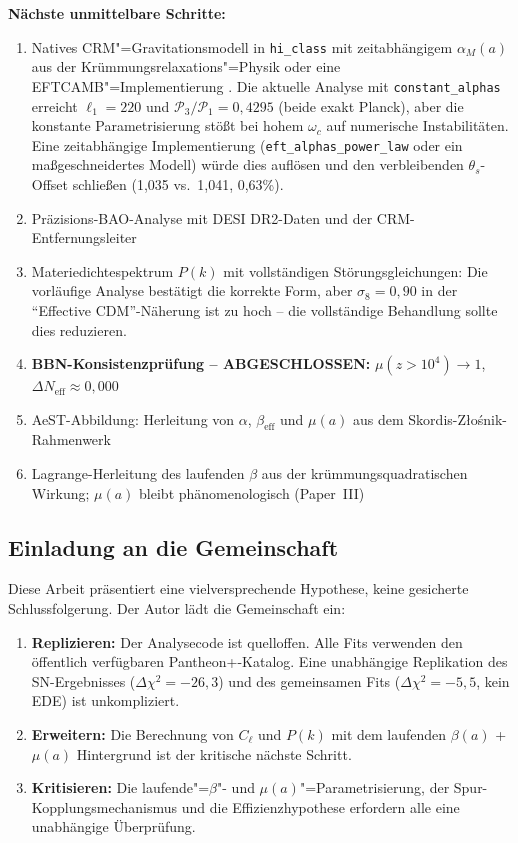 \documentclass[aps,prd,twocolumn,superscriptaddress,nofootinbib,floatfix]{revtex4-2}
\begin{document}
\textbf{Nächste unmittelbare Schritte:}
\begin{enumerate}
\item Natives CRM"=Gravitationsmodell in \texttt{hi\_class} mit zeitabhängigem $\alpha_M(a)$ aus der Krümmungsrelaxations"=Physik oder eine EFTCAMB"=Implementierung \cite{Hu2014}. Die aktuelle Analyse mit \texttt{constant\_alphas} erreicht $\ell_1 = 220$ und $\mathcal{P}_3/\mathcal{P}_1 = 0{,}4295$ (beide exakt Planck), aber die konstante Parametrisierung stößt bei hohem $\omega_c$ auf numerische Instabilitäten. Eine zeitabhängige Implementierung (\texttt{eft\_alphas\_power\_law} oder ein maßgeschneidertes Modell) würde dies auflösen und den verbleibenden $\theta_s$-Offset schließen (1,035 vs.\ 1,041, 0,63\%).
\item Präzisions-BAO-Analyse mit DESI DR2-Daten und der CRM-Entfernungsleiter
\item Materiedichtespektrum $P(k)$ mit vollständigen Störungsgleichungen: Die vorläufige Analyse bestätigt die korrekte Form, aber $\sigma_8 = 0{,}90$ in der "`Effective CDM"'-Näherung ist zu hoch -- die vollständige Behandlung sollte dies reduzieren.
\item \textbf{BBN-Konsistenzprüfung -- ABGESCHLOSSEN:} $\mu(z > 10^4) \to 1$, $\Delta N_{\mathrm{eff}} \approx 0{,}000$ \cite{Pitrou2018}
\item AeST-Abbildung: Herleitung von $\alpha$, $\beta_{\mathrm{eff}}$ und $\mu(a)$ aus dem Skordis-Z{\l}o\'snik-Rahmenwerk
\item Lagrange-Herleitung des laufenden $\beta$ aus der krümmungsquadratischen Wirkung; $\mu(a)$ bleibt phänomenologisch (Paper~III)
\end{enumerate}

\subsection{Einladung an die Gemeinschaft}

Diese Arbeit präsentiert eine vielversprechende Hypothese, keine gesicherte Schlussfolgerung. Der Autor lädt die Gemeinschaft ein:
\begin{enumerate}
\item \textbf{Replizieren:} Der Analysecode ist quelloffen. Alle Fits verwenden den öffentlich verfügbaren Pantheon+-Katalog. Eine unabhängige Replikation des SN-Ergebnisses ($\Delta\chi^2 = -26{,}3$) und des gemeinsamen Fits ($\Delta\chi^2 = -5{,}5$, kein EDE) ist unkompliziert.
\item \textbf{Erweitern:} Die Berechnung von $C_\ell$ und $P(k)$ mit dem laufenden $\beta(a)$ + $\mu(a)$ Hintergrund ist der kritische nächste Schritt.
\item \textbf{Kritisieren:} Die laufende"=$\beta$"- und $\mu(a)$"=Parametrisierung, der Spur-Kopplungsmechanismus und die Effizienzhypothese erfordern alle eine unabhängige Überprüfung.
\end{enumerate}
\end{document}
